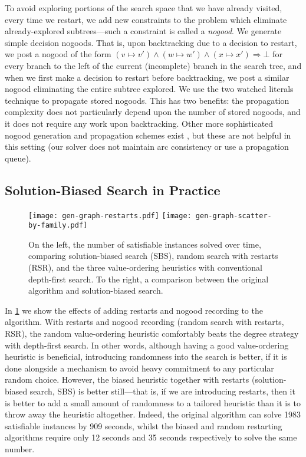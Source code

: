 \documentclass[runningheads]{llncs}
\newcommand{\siplineref}[1]{line~\ref{line:sip:#1}}
\begin{document}
To avoid exploring portions of the search
space that we have already visited, every time we restart, we add new constraints to the problem
which eliminate already-explored subtrees---such a constraint is called a \emph{nogood}. We generate
simple decision nogoods. That is, upon backtracking due to a decision to restart, we post a nogood
of the form $(v \mapsto v') \wedge (w \mapsto w') \wedge (x \mapsto x') \Rightarrow \bot$ for every
branch to the left of the current (incomplete) branch in the search tree, and when we first make a
decision to restart before backtracking, we post a similar nogood eliminating the entire subtree
explored. We use the two watched literals technique \cite{DBLP:conf/dac/MoskewiczMZZM01} to
propagate stored nogoods.
This has two benefits: the propagation complexity does not particularly depend upon the number of
stored nogoods, and it does not require any work upon backtracking.  Other more sophisticated nogood
generation and propagation schemes exist \cite{DBLP:conf/aaai/LeeSZ16,DBLP:conf/cp/GlorianBLLM17},
but these are not helpful in this setting (our solver does not maintain arc consistency or use a
propagation queue).

\subsection{Solution-Biased Search in Practice}

\begin{figure}[tb]
    \texttt{[image: gen-graph-restarts.pdf]}
    \hfill
    \texttt{[image: gen-graph-scatter-by-family.pdf]}

    \caption{On the left, the number of satisfiable instances solved over time, comparing
    solution-biased search (SBS), random search with restarts (RSR), and the three value-ordering
    heuristics with conventional depth-first search. To the right, a comparison between the original
    algorithm and solution-biased search.}
    \label{figure:old-vs-new}
\end{figure}

In \cref{figure:old-vs-new} we show the effects of adding restarts and nogood recording to the
algorithm. With restarts and nogood recording (random search with restarts, RSR), the random
value-ordering heuristic comfortably beats the degree strategy with depth-first search. In other
words, although having a good value-ordering heuristic is beneficial, introducing randomness into
the search is better, if it is done alongside a mechanism to avoid heavy commitment to any
particular random choice. However, the biased heuristic together
with restarts (solution-biased search, SBS) is better still---that is, if we are introducing
restarts, then it is better to add a small amount of randomness to a tailored heuristic than it is
to throw away the heuristic altogether.  Indeed, the original algorithm can solve 1983 satisfiable
instances by 909 seconds, whilst the biased and random restarting algorithms require only 12 seconds
and 35 seconds respectively to solve the same number.
\end{document}
